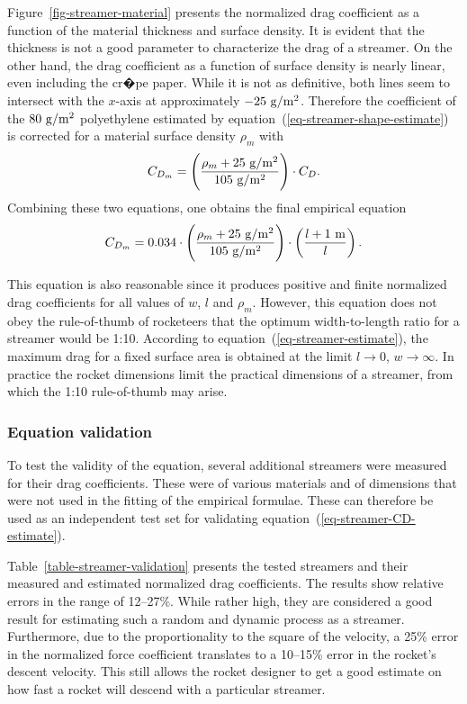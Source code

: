 Figure~\ref{fig-streamer-material} presents the normalized drag
coefficient as a function of the material thickness and surface
density.  It is evident that the thickness is not a good
parameter to characterize the drag of a streamer.  On the other hand,
the drag coefficient as a function of surface density is nearly
linear, even including the cr�pe paper.  While it is not as
definitive, both lines seem to intersect with the $x$-axis at
approximately  $\rm-25~g/m^2$.  Therefore the coefficient of the
$\rm80~g/m^2$ polyethylene estimated by
equation~(\ref{eq-streamer-shape-estimate}) is corrected for a
material surface density $\rho_m$ with
%
\begin{equation}
C_{D_m} = \left(\frac{\rho_m + \rm 25~g/m^2}{\rm 105~g/m^2}\right)
    \cdot C_D.
\end{equation}
%
Combining these two equations, one obtains the final empirical
equation
%
\begin{equation}
C_{D_m} = 0.034 \cdot
    \left(\frac{\rho_m + \rm 25~g/m^2}{\rm 105~g/m^2}\right) \cdot
    \left(\frac{l + 1~{\rm m}}{l}\right).
\label{eq-streamer-CD-estimate}
\end{equation}

This equation is also reasonable since it produces positive and finite
normalized drag coefficients for all values of $w$, $l$ and $\rho_m$.
However, this equation does not obey the rule-of-thumb of rocketeers
that the optimum width-to-length ratio for a streamer would be 1:10.
According to equation~(\ref{eq-streamer-estimate}), the maximum drag
for a fixed surface area is obtained at the limit $l\rightarrow0$,
$w\rightarrow\infty$.  In practice the rocket dimensions limit the
practical dimensions of a streamer, from which the 1:10 rule-of-thumb
may arise.


\subsubsection*{Equation validation}

To test the validity of the equation, several additional streamers
were measured for their drag coefficients.  These were of various
materials and of dimensions that were not used in the fitting of the
empirical formulae.  These can therefore be used as an independent
test set for validating equation~(\ref{eq-streamer-CD-estimate}).

Table~\ref{table-streamer-validation} presents the tested streamers
and their measured and estimated normalized drag coefficients.  The
results show relative errors in the range of 12--27\%.  While rather
high, they are considered a good result for estimating such a random
and dynamic process as a streamer.  Furthermore, due to the
proportionality to the square of the velocity, a 25\% error in the
normalized force coefficient translates to a 10--15\% error in the
rocket's descent velocity.  This still allows the rocket designer to
get a good estimate on how fast a rocket will descend with a
particular streamer.


